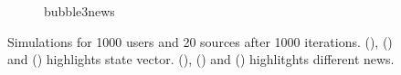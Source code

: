 \begin{figure}
\begin{subfigure}[t]{0.35\textwidth}
    \caption{bubble3news}
    \label{fig:bubble7news}
  \end{subfigure}
  \caption[Network results: bubble chamber]{Simulations for 1000 users and 20 sources after 1000
    iterations. (), () and
    () highlights state vector.
    (), () and
   () highlitghts different news.
  }
  \label{fig:test}
\end{figure}
